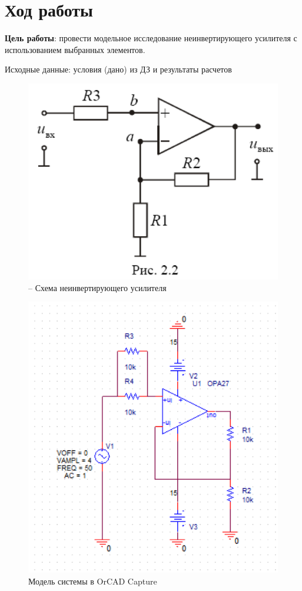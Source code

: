 \chapter{Ход работы}

\textbf{Цель работы}: провести модельное исследование неинвертирующего усилителя с использованием выбранных элементов.

Исходные данные: условия (дано) из ДЗ и результаты расчетов

\begin{figure}[h!]
	\centering
	\caption{– Схема неинвертирующего усилителя}
	\includegraphics{images/1.png}
\end{figure}


\begin{figure}[h!]
	\centering
	\caption{Модель системы в OrCAD Capture}
	\includegraphics{images/2.png}
\end{figure}

